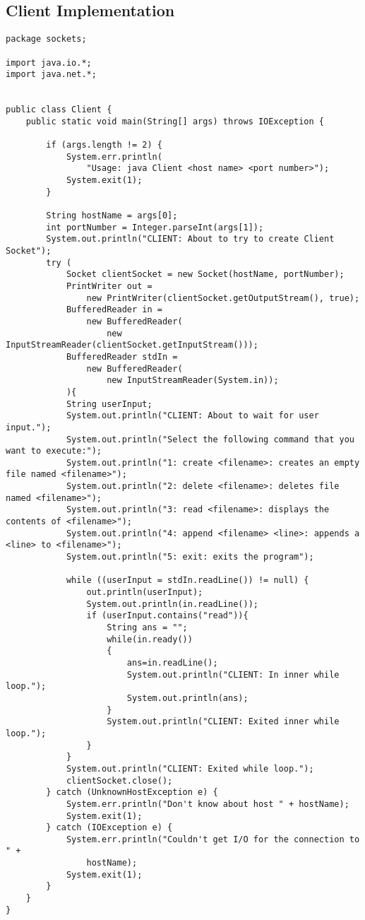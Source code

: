 \documentclass{article}
\begin{document}
	\subsection{Client Implementation}
		\begin{lstlisting}
package sockets;

import java.io.*;
import java.net.*;


public class Client {
	public static void main(String[] args) throws IOException {
        
        if (args.length != 2) {
            System.err.println(
                "Usage: java Client <host name> <port number>");
            System.exit(1);
        }
 
        String hostName = args[0];
        int portNumber = Integer.parseInt(args[1]);
        System.out.println("CLIENT: About to try to create Client Socket");
        try (
            Socket clientSocket = new Socket(hostName, portNumber);
        	PrintWriter out =
                new PrintWriter(clientSocket.getOutputStream(), true);
        	BufferedReader in =
                new BufferedReader(
                    new InputStreamReader(clientSocket.getInputStream()));
            BufferedReader stdIn =
                new BufferedReader(
                    new InputStreamReader(System.in));
        	){
        	String userInput;
        	System.out.println("CLIENT: About to wait for user input.");
        	System.out.println("Select the following command that you want to execute:");
    		System.out.println("1: create <filename>: creates an empty file named <filename>");
    		System.out.println("2: delete <filename>: deletes file named <filename>");
    		System.out.println("3: read <filename>: displays the contents of <filename>");
    		System.out.println("4: append <filename> <line>: appends a <line> to <filename>");
    		System.out.println("5: exit: exits the program");
            
    		while ((userInput = stdIn.readLine()) != null) {
    			out.println(userInput);
    			System.out.println(in.readLine());
    			if (userInput.contains("read")){
    				String ans = "";
    				while(in.ready())
                    {
    					ans=in.readLine();
                    	System.out.println("CLIENT: In inner while loop.");
                    	System.out.println(ans);
                    }
                    System.out.println("CLIENT: Exited inner while loop.");
    			}
    		}
            System.out.println("CLIENT: Exited while loop.");
            clientSocket.close();
        } catch (UnknownHostException e) {
            System.err.println("Don't know about host " + hostName);
            System.exit(1);
        } catch (IOException e) {
            System.err.println("Couldn't get I/O for the connection to " +
                hostName);
            System.exit(1);
        } 
    }
}
		\end{lstlisting}
\end{document}
